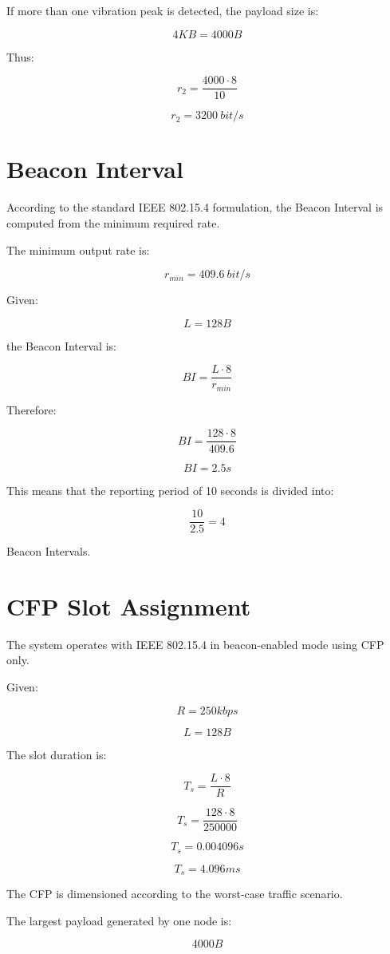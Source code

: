 \documentclass[a4paper,12pt]{article}
\begin{document}
If more than one vibration peak is detected, the payload size is:

\[
4KB=4000B
\]

Thus:

\[
r_2=\frac{4000\cdot8}{10}
\]

\[
r_2=3200\ bit/s
\]

\section{Beacon Interval}

According to the standard IEEE 802.15.4 formulation, the Beacon Interval is computed from the minimum required rate.

The minimum output rate is:

\[
r_{min}=409.6\ bit/s
\]

Given:

\[
L=128B
\]

the Beacon Interval is:

\[
BI=\frac{L\cdot8}{r_{min}}
\]

Therefore:

\[
BI=\frac{128\cdot8}{409.6}
\]

\[
BI=2.5s
\]

This means that the reporting period of 10 seconds is divided into:

\[
\frac{10}{2.5}=4
\]

Beacon Intervals.

\section{CFP Slot Assignment}

The system operates with IEEE 802.15.4 in beacon-enabled mode using CFP only.

Given:

\[
R=250kbps
\]

\[
L=128B
\]

The slot duration is:

\[
T_s=\frac{L\cdot8}{R}
\]

\[
T_s=\frac{128\cdot8}{250000}
\]

\[
T_s=0.004096s
\]

\[
T_s=4.096ms
\]

The CFP is dimensioned according to the worst-case traffic scenario.

The largest payload generated by one node is:

\[
4000B
\]
\end{document}
